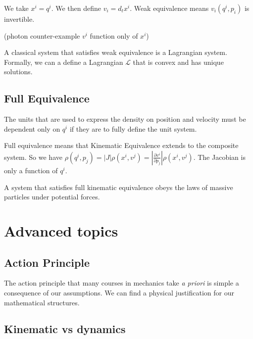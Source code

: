 \documentclass{article}
\begin{document}
\begin{defn}
	We take $x^i = q^i$. We then define $v_i = d_tx^i$. Weak equivalence means $v_i(q^i, p_i)$ is invertible.
\end{defn}

(photon counter-example $v^i$ function only of $x^i$)

\begin{prop}
	A classical system that satisfies weak equivalence is a Lagrangian system. Formally, we can a define a Lagrangian $\mathcal{L}$ that is convex and has unique solutions.
\end{prop}

\subsection{Full Equivalence}

The units that are used to express the density on position and velocity must be dependent only on $q^i$ if they are to fully define the unit system.

\begin{defn}
	Full equivalence means that Kinematic Equivalence extends to the composite system. So we have $\rho(q^i,p_j) = \left|J\right|\rho(x^i,v^j) = \left|\frac{\partial v^i}{\partial p_j}\right|\rho(x^i,v^j)$. The Jacobian is only a function of $q^i$.
\end{defn}

\begin{prop}
	A system that satisfies full kinematic equivalence obeys the laws of massive particles under potential forces.
\end{prop}

\section{Advanced topics}

\subsection{Action Principle}

The action principle that many courses in mechanics take \emph{a priori} is simple a consequence of our assumptions. We can find a physical justification for our mathematical structures.

\subsection{Kinematic vs dynamics}
\end{document}
